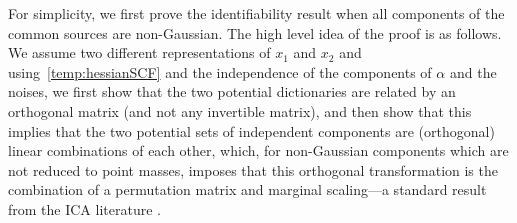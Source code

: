 \documentclass{article}
\begin{document}
For simplicity, we first prove the identifiability result when all components of the common sources are non-Gaussian.
The high level idea of the proof is as follows. We assume two different representations of $x_1$ and $x_2$ and using~\eqref{temp:hessianSCF} and the independence of the components of $\alpha$ and the noises, we first show that the two potential dictionaries are related by an orthogonal matrix (and not any invertible matrix), and then show that this implies that the two potential sets of independent components are (orthogonal) linear combinations of each other, which, for non-Gaussian components which are not reduced to point masses, imposes that this orthogonal transformation is the combination of a permutation matrix and marginal scaling---a standard result from the ICA literature \citep[Theorem 11]{Com1994}.
\end{document}
